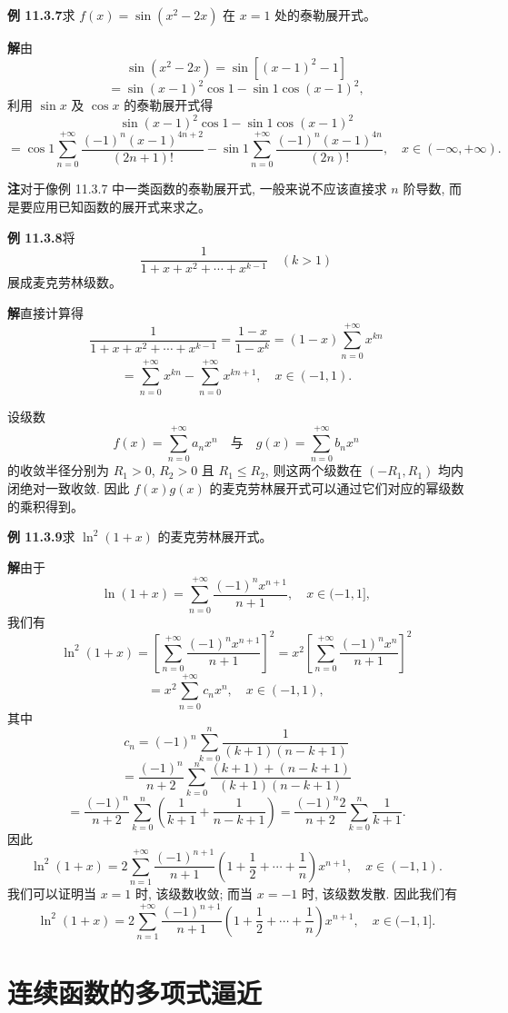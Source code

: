 \documentclass[UTF8,12pt,a4paper,fontset=fandol]{ctexart}
\begin{document}
\noindent\textbf{例 11.3.7}\quad 求 $f(x)=\sin(x^2-2x)$ 在 $x=1$ 处的泰勒展开式。

\noindent\textbf{解}\quad 由
\[
  \sin(x^2-2x)
  =
  \sin[(x-1)^2-1]
\]
\[
  =
  \sin(x-1)^2\cos1-\sin1\cos(x-1)^2,
\]
利用 $\sin x$ 及 $\cos x$ 的泰勒展开式得
\[
  \sin(x-1)^2\cos1-\sin1\cos(x-1)^2
\]
\[
  =
  \cos1\sum_{n=0}^{+\infty}
  \frac{(-1)^n(x-1)^{4n+2}}{(2n+1)!}
  -
  \sin1\sum_{n=0}^{+\infty}
  \frac{(-1)^n(x-1)^{4n}}{(2n)!},
  \quad x\in(-\infty,+\infty).
\]

\noindent\textbf{注}\quad 对于像例 11.3.7 中一类函数的泰勒展开式, 一般来说不应该直接求 $n$ 阶导数, 而是要应用已知函数的展开式来求之。

\noindent\textbf{例 11.3.8}\quad 将
\[
  \frac1{1+x+x^2+\cdots+x^{k-1}}\quad(k>1)
\]
展成麦克劳林级数。

\noindent\textbf{解}\quad 直接计算得
\[
  \frac1{1+x+x^2+\cdots+x^{k-1}}
  =
  \frac{1-x}{1-x^k}
  =
  (1-x)\sum_{n=0}^{+\infty}x^{kn}
\]
\[
  =
  \sum_{n=0}^{+\infty}x^{kn}
  -
  \sum_{n=0}^{+\infty}x^{kn+1},
  \quad x\in(-1,1).
\]

设级数
\[
  f(x)=\sum_{n=0}^{+\infty}a_nx^n
  \quad\text{与}\quad
  g(x)=\sum_{n=0}^{+\infty}b_nx^n
\]
的收敛半径分别为 $R_1>0$, $R_2>0$ 且 $R_1\leqslant R_2$, 则这两个级数在 $(-R_1,R_1)$ 均内闭绝对一致收敛. 因此 $f(x)g(x)$ 的麦克劳林展开式可以通过它们对应的幂级数的乘积得到。

\noindent\textbf{例 11.3.9}\quad 求 $\ln^2(1+x)$ 的麦克劳林展开式。

\noindent\textbf{解}\quad 由于
\[
  \ln(1+x)=\sum_{n=0}^{+\infty}\frac{(-1)^nx^{n+1}}{n+1},
  \quad x\in(-1,1],
\]
我们有
\[
  \ln^2(1+x)
  =
  \left[\sum_{n=0}^{+\infty}\frac{(-1)^nx^{n+1}}{n+1}\right]^2
  =
  x^2\left[\sum_{n=0}^{+\infty}\frac{(-1)^nx^n}{n+1}\right]^2
\]
\[
  =
  x^2\sum_{n=0}^{+\infty}c_nx^n,
  \quad x\in(-1,1),
\]
其中
\[
  c_n
  =
  (-1)^n\sum_{k=0}^{n}\frac1{(k+1)(n-k+1)}
\]
\[
  =
  \frac{(-1)^n}{n+2}
  \sum_{k=0}^{n}
  \frac{(k+1)+(n-k+1)}{(k+1)(n-k+1)}
\]
\[
  =
  \frac{(-1)^n}{n+2}
  \sum_{k=0}^{n}
  \left(\frac1{k+1}+\frac1{n-k+1}\right)
  =
  \frac{(-1)^n2}{n+2}\sum_{k=0}^{n}\frac1{k+1}.
\]
因此
\[
  \ln^2(1+x)
  =
  2\sum_{n=1}^{+\infty}
  \frac{(-1)^{n+1}}{n+1}
  \left(1+\frac12+\cdots+\frac1n\right)x^{n+1},
  \quad x\in(-1,1).
\]
我们可以证明当 $x=1$ 时, 该级数收敛; 而当 $x=-1$ 时, 该级数发散. 因此我们有
\[
  \ln^2(1+x)
  =
  2\sum_{n=1}^{+\infty}
  \frac{(-1)^{n+1}}{n+1}
  \left(1+\frac12+\cdots+\frac1n\right)x^{n+1},
  \quad x\in(-1,1].
\]

\section{连续函数的多项式逼近}
\end{document}

